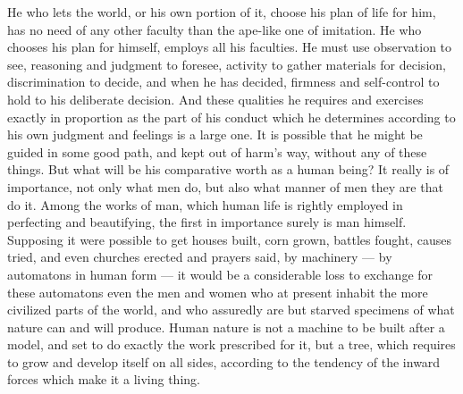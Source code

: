 \documentclass[12pt]{report}
\begin{document}
He who lets the world, or his own portion of it, choose his plan of life for him, has no need of any other faculty than the ape-like one of imitation. He who chooses his plan for himself, employs all his faculties. He must use observation to see, reasoning and judgment to foresee, activity to gather materials for decision, discrimination to decide, and when he has decided, firmness and self-control to hold to his deliberate decision. And these qualities he requires and exercises exactly in proportion as the part of his conduct which he determines according to his own judgment and feelings is a large one. It is possible that he might be guided in some good path, and kept out of harm's way, without any of these things. But what will be his comparative worth as a human being? It really is of importance, not only what men do, but also what manner of men they are that do it. Among the works of man, which human life is rightly employed in perfecting and beautifying, the first in importance surely is man himself. Supposing it were possible to get houses built, corn grown, battles fought, causes tried, and even churches erected and prayers said, by machinery — by automatons in human form — it would be a considerable loss to exchange for these automatons even the men and women who at present inhabit the more civilized parts of the world, and who assuredly are but starved specimens of what nature can and will produce. Human nature is not a machine to be built after a model, and set to do exactly the work prescribed for it, but a tree, which requires to grow and develop itself on all sides, according to the tendency of the inward forces which make it a living thing.
\end{document}
